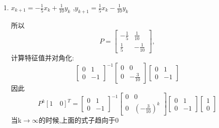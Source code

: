 \documentclass[11pt, a4paper, UTF8]{ctexart}
\begin{document}
\begin{solution}
	\begin{enumerate}

		\item $x_{k+1}=-\frac{1}{5}x_{k}+\frac{1}{10}y_{k}$
		,$y_{k+1}=\frac{1}{5}x_k-\frac{1}{10}y_k$

		所以$$
			P={
			\left[ \begin{array}{cc}
			-\frac{1}{5} & \frac{1}{10} \\
			\frac{1}{5} & -\frac{1}{10} 
			\end{array} 
			\right ]},		
		$$
		计算特征值并对角化:$${
			\left[ \begin{array}{cc}
			0 & 1 \\
			0 & -1
			\end{array} 
			\right ]}^{-1}{
			\left[ \begin{array}{cc}
			0 & 0 \\
			0 & -\frac{3}{10} 
			\end{array} 
			\right ]}{
			\left[ \begin{array}{cc}
			0 & 1 \\
			0 & -1
			\end{array} 
			\right ]}$$
		因此$$P^{k}[1\quad 0]^{T}={
			\left[ \begin{array}{cc}
			0 & 1 \\
			0 & -1
			\end{array} 
			\right ]}^{-1}{
			\left[ \begin{array}{cc}
			0 & 0 \\
			0 & (-\frac{3}{10})^{k} 
			\end{array} 
			\right ]}{
			\left[ \begin{array}{cc}
			0 & 1 \\
			0 & -1
			\end{array} 
			\right ]}{
			\left[ \begin{array}{c}
			1  \\
			0 
			\end{array} 
			\right ]}$$
		当k$\rightarrow \infty$的时候,上面的式子趋向于0
	
	\end{enumerate}
    
\end{solution}
\end{document}
